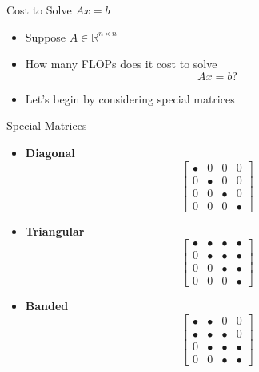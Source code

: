 \documentclass[10pt]{beamer}
\begin{document}

\begin{frame}{Cost to Solve $Ax=b$}

\begin{itemize}
    \item Suppose $A\in\mathbb{R}^{n\times n}$
        \vfill 
    \item How many FLOPs does it cost to solve 
    $$Ax=b?$$
        \vfill 
    \item Let's begin by considering special matrices
\end{itemize}
    
\end{frame}

\begin{frame}{Special Matrices}
\begin{itemize}
    \item \textbf{Diagonal}
    \[
    \begin{bmatrix}
    \bullet & 0 & 0 & 0 \\
    0 & \bullet & 0 & 0 \\
    0 & 0 & \bullet & 0 \\
    0 & 0 & 0 & \bullet
    \end{bmatrix}
    \]

    \item \textbf{Triangular}
    \[
    \begin{bmatrix}
    \bullet & \bullet & \bullet & \bullet \\
    0 & \bullet & \bullet & \bullet \\
    0 & 0 & \bullet & \bullet \\
    0 & 0 & 0 & \bullet
    \end{bmatrix}
    \]

    \item \textbf{Banded}
    \[
    \begin{bmatrix}
    \bullet & \bullet & 0 & 0 \\
    \bullet & \bullet & \bullet & 0 \\
    0 & \bullet & \bullet & \bullet \\
    0 & 0 & \bullet & \bullet
    \end{bmatrix}
    \]
\end{itemize}

\end{frame}
\end{document}
